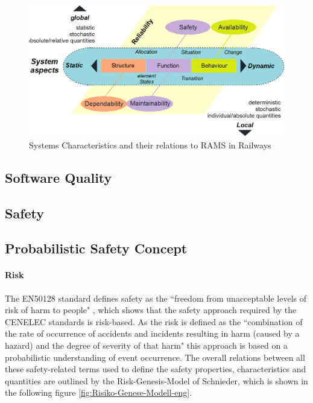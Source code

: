 \documentclass{template/openetcs_report}
\begin{document}
\begin{figure}[htbp]
\centering
\includegraphics[width=0.7\linewidth]{images/bld_Reliability-system-characteristics}
\caption{Systems Characteristics and their relations to RAMS in Railways \cite{Schnieder.2013}}
\label{fig:Reliability-RAMS}
\end{figure}

\subsection{Software Quality}


\subsection{Safety}



\subsection{Probabilistic Safety Concept}

\paragraph{Risk}

The EN50128 standard defines safety as the ``freedom from unacceptable levels of risk of harm to people" \cite{EN50128:2011}, which shows that the safety approach required by the CENELEC standards is risk-based. As the risk is defined as the ``combination of the rate of occurrence of accidents and incidents resulting in harm (caused by a hazard) and the degree of severity  of that harm" \cite{EN50128:2011} this approach is based on a probabilistic understanding of event occurrence. The overall relations between all these safety-related terms used to define the safety properties, characteristics and quantities are outlined by the Risk-Genesis-Model of Schnieder, which is shown in the following figure \ref{fig:Risiko-Genese-Modell-eng}.
\end{document}
